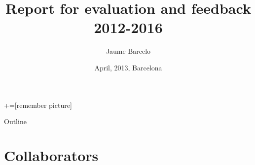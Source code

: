 \documentclass{beamer}
\title[MAC for mesh] %
{
Report for evaluation and feedback \\
2012-2016
}
\author[Barcelo] %
{
Jaume Barcelo
}
\institute[institute] %
{
Universitat Pompeu Fabra
}
\date[date] %
{
April, 2013, Barcelona
}
\begin{document}
+=[remember picture]

\begin{frame}
  \titlepage
\end{frame}

\begin{frame}{Outline}
  \tableofcontents
\end{frame}





\section{Collaborators}
\end{document}
